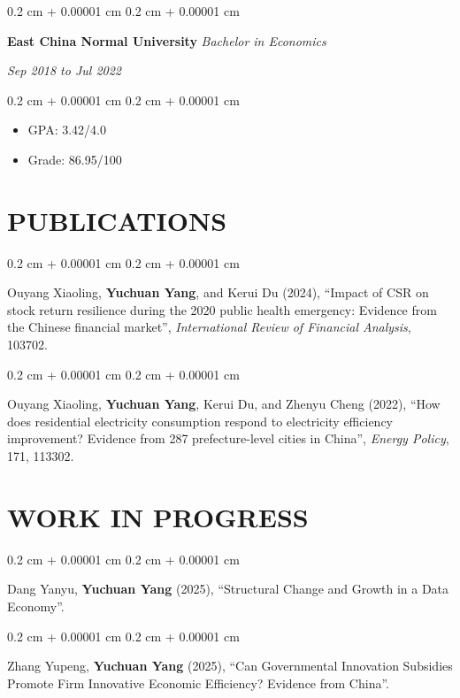 \documentclass[10pt, letterpaper]{article}
\newenvironment{highlights}{
    \begin{itemize}[
        topsep=0.10 cm,
        parsep=0.10 cm,
        partopsep=0pt,
        itemsep=0pt,
        leftmargin=0.4 cm + 10pt
    ]
}{
    \end{itemize}
} %
\newenvironment{onecolentry}{
    \begin{adjustwidth}{
        0.2 cm + 0.00001 cm
    }{
        0.2 cm + 0.00001 cm
    }
}{
    \end{adjustwidth}
} %
\newenvironment{twocolentry}[2][]{
    \onecolentry
    \def\secondColumn{#2}
    \setcolumnwidth{\fill, 4.5 cm}
    \begin{paracol}{2}
}{
    \switchcolumn \raggedleft \secondColumn
    \end{paracol}
    \endonecolentry
} %
\newenvironment{paper}{\vspace{.2cm}\begin{samepage}\begin{onecolentry}}{\end{onecolentry}\end{samepage}\vspace{0.2cm}}
\begin{document}
\vspace{0.2 cm}

\begin{twocolentry}{
		\textit{Sep 2018 to Jul 2022}}
	\textbf{East China Normal University}
	\textit{Bachelor in Economics}
\end{twocolentry}

\vspace{0.10 cm}

\begin{onecolentry}
	\begin{highlights}
		\item GPA: 3.42/4.0
		\item Grade: 86.95/100
	\end{highlights}
\end{onecolentry}



\section{PUBLICATIONS}

\begin{paper}
Ouyang Xiaoling, \textbf{Yuchuan Yang}, and Kerui Du (2024), ``Impact of CSR on stock return resilience during the 2020 public health emergency: Evidence from the Chinese financial market'', \textit{International Review of Financial Analysis}, 103702.
\end{paper}

\begin{paper}
Ouyang Xiaoling, \textbf{Yuchuan Yang}, Kerui Du, and Zhenyu Cheng (2022), ``How does residential electricity consumption respond to electricity efficiency improvement? Evidence from 287 prefecture-level cities in China'', \textit{Energy Policy}, 171, 113302.
\end{paper}



\section{WORK IN PROGRESS}

\begin{paper}
Dang Yanyu, \textbf{Yuchuan Yang} (2025), ``Structural Change and Growth in a Data Economy''.
\end{paper}

\begin{paper}
Zhang Yupeng, \textbf{Yuchuan Yang} (2025), ``Can Governmental Innovation Subsidies Promote Firm Innovative Economic Efficiency? Evidence from China''.
\end{paper}
\end{document}
